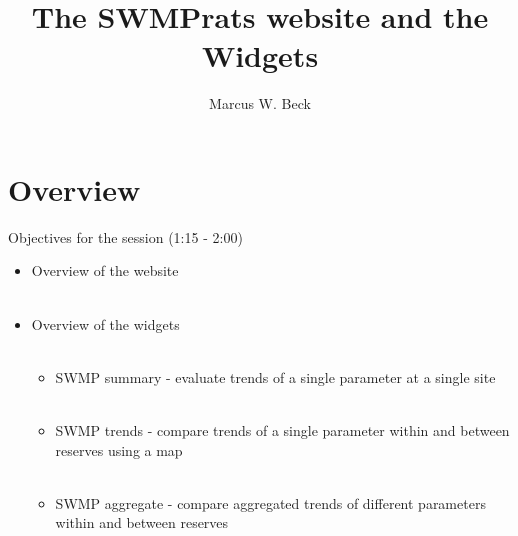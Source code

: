\documentclass[xcolor=dvipsnames,serif]{beamer}\usepackage[]{graphicx}\usepackage[]{color}
\begin{document}
\title[SWMPrats, Widgets]{The SWMPrats website and the Widgets}

\author[M. Beck]{Marcus W. Beck}

\date{}







\section{Overview}

\begin{frame}{Objectives for the session (1:15 - 2:00)}
\begin{itemize}
\item Overview of the website \\~\\
\item Overview of the widgets \\~\\
\begin{itemize}
\item SWMP summary - evaluate trends of a single parameter at a single site \\~\\
\item SWMP trends - compare trends of a single parameter within and between reserves using a map \\~\\
\item SWMP aggregate - compare aggregated trends of different parameters within and between reserves \\~\\
\end{itemize}
\end{itemize}
\end{frame}
\end{document}
